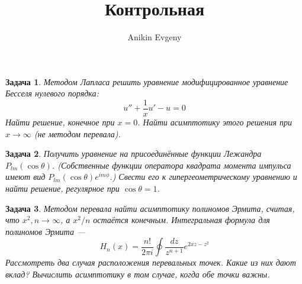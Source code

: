 \documentclass{article}
\title{Контрольная}
\author{Anikin Evgeny}
\newtheorem{problem}{Задача}
\begin{document}
    \begin{problem}
        Методом Лапласа решить уравнение модифицированное уравнение Бесселя 
        нулевого порядка:
        \begin{equation}
            u'' + \frac{1}{x}u' - u = 0
        \end{equation}
        Найти решение, конечное при $x = 0$. Найти асимптотику этого решения 
        при $x \to \infty$ (не методом перевала).
    \end{problem}
    \begin{problem}
        Получить уравнение на присоединённые функции Лежандра $P_{lm}(\cos{\theta})$.
        (Собственные функции оператора квадрата момента импульса имеют вид 
        $P_{lm}(\cos{\theta})e^{im\phi}$.)
        Свести его к гипергеометрическому уравнению и найти решение, регулярное при
        $\cos{\theta} = 1$.
    \end{problem}
    \begin{problem}
        Методом перевала найти асимптотику полиномов Эрмита, считая, что 
        $x^2, n \to \infty$, а $x^2/n$ остаётся конечным. Интегральная формула
        для полиномов Эрмита ---
        \begin{equation}
            H_n(x) = \frac{n!}{2\pi i} \oint \frac{dz}{z^{n+1}} e^{2xz - z^2}
        \end{equation}
        Рассмотреть два случая расположения перевальных точек. Какие из них 
        дают вклад?
        Вычислить асимптотику в том случае, когда обе точки важны.
    \end{problem}
\end{document}
